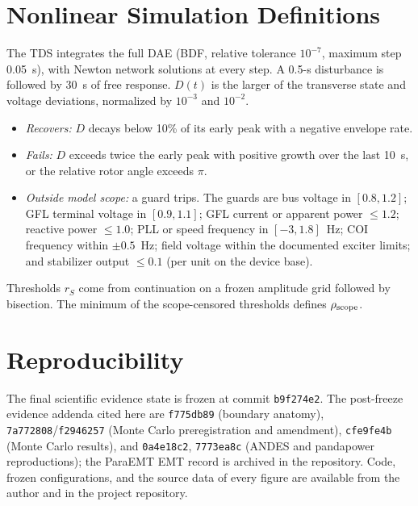 \documentclass[journal]{IEEEtran}
\theoremstyle{definition}
\theoremstyle{remark}
\begin{document}
\section{Nonlinear Simulation Definitions}\label{app:tds}
The TDS integrates the full DAE (BDF, relative tolerance $10^{-7}$, maximum
step 0.05~s), with Newton network solutions at every step. A 0.5-s disturbance
is followed by 30~s of free response. $D(t)$ is the larger of the transverse
state and voltage deviations, normalized by $10^{-3}$ and $10^{-2}$.
\begin{itemize}
\item \emph{Recovers:} $D$ decays below 10\% of its early peak with a negative
envelope rate.
\item \emph{Fails:} $D$ exceeds twice the early peak with positive growth over
the last 10~s, or the relative rotor angle exceeds $\pi$.
\item \emph{Outside model scope:} a guard trips. The guards are bus voltage in
$[0.8,1.2]$; GFL terminal voltage in $[0.9,1.1]$; GFL current or apparent power
$\le1.2$; reactive power $\le1.0$; PLL or speed frequency in $[-3,1.8]$~Hz; COI
frequency within $\pm0.5$~Hz; field voltage within the documented exciter
limits; and stabilizer output $\le0.1$ (per unit on the device base).
\end{itemize}
Thresholds $r_S$ come from continuation on a frozen amplitude grid followed by
bisection. The minimum of the scope-censored thresholds defines
$\rho_{\rm scope}$.

\section*{Reproducibility}
The final scientific evidence state is frozen at commit \texttt{b9f274e2}.
The post-freeze evidence addenda cited here are \texttt{f775db89} (boundary
anatomy), \texttt{7a772808}/\texttt{f2946257} (Monte Carlo preregistration and
amendment), \texttt{cfe9fe4b} (Monte Carlo results), and \texttt{0a4e18c2},
\texttt{7773ea8c} (ANDES and pandapower reproductions); the ParaEMT EMT record
is archived in the repository. Code, frozen
configurations, and the source data of every figure are available from the
author and in the project repository.

\balance


\end{document}
